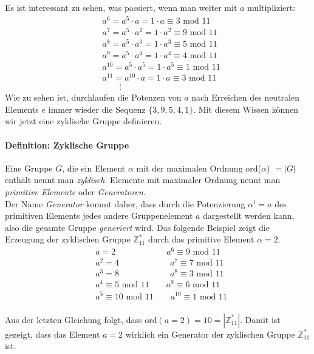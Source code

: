 Es ist interessant zu sehen, was passiert, wenn man weiter mit $a$ multipliziert:
\begin{align*}
&a^6 = a^5 \cdot a = 1 \cdot a \equiv 3 \text{ mod } 11\\
&a^7 = a^5 \cdot a^2 = 1 \cdot a^2 \equiv 9 \text{ mod } 11\\
&a^8 = a^5 \cdot a^3 = 1 \cdot a^3 \equiv 5 \text{ mod } 11\\
&a^9 = a^5 \cdot a^4 = 1 \cdot a^4 \equiv 4 \text{ mod } 11\\
&a^{10} = a^5 \cdot a^5 = 1 \cdot a^5 \equiv 1 \text{ mod } 11\\
&a^{11} = a^{10} \cdot a = 1 \cdot a \equiv 3 \text{ mod } 11\\
&\qquad \vdots
\end{align*}
Wie zu sehen ist, durchlaufen die Potenzen von $a$ nach Erreichen des neutralen Elements $e$ immer wieder die Sequenz $\{3,9,5,4,1\}$. Mit diesem Wissen können wir jetzt eine zyklische Gruppe definieren.

\paragraph{Definition: Zyklische Gruppe}
Eine Gruppe $G$, die ein Element $\alpha$ mit der maximalen Ordnung ord($\alpha$) $= |G|$ enthält nennt man \textit{zyklisch}. Elemente mit maximaler Ordnung nennt man \textit{primitive Elemente} oder \textit{Generatoren}.\\

Der Name \textit{Generator} kommt daher, dass durch die Potenzierung $\alpha^i = a$ des primitiven Elements jedes andere Gruppenelement $a$ dargestellt werden kann, also die gesamte Gruppe \textit{generiert} wird. Das folgende Beispiel zeigt die Erzeugung der zyklischen Gruppe $\mathbb{Z}^*_{11}$ durch das primitive Element $\alpha = 2$.
\begin{align*}
&a = 2 \qquad \qquad \qquad a^6 \equiv 9 \text{ mod } 11\\
&a^2 = 4 \qquad \qquad \qquad a^7 \equiv 7 \text{ mod } 11\\
&a^3 = 8 \qquad \qquad \qquad a^8 \equiv 3 \text{ mod } 11\\
&a^4 \equiv 5 \text{ mod } 11 \qquad a^9 \equiv 6 \text{ mod } 11\\
&a^5 \equiv 10 \text{ mod } 11 \qquad a^{10} \equiv 1 \text{ mod } 11\\
\end{align*}

Aus der letzten Gleichung folgt, dass ord$(a=2)=10=|\mathbb{Z}^*_{11}|$. Damit ist gezeigt, dass das Element $a = 2$ wirklich ein Generator der zyklischen Gruppe $\mathbb{Z}^*_{11}$ ist.

